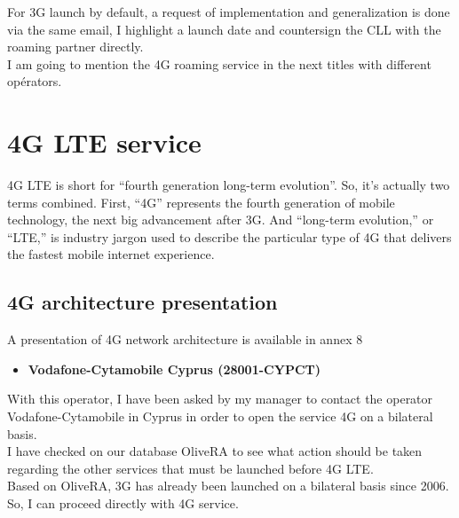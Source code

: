 For \acs{3G} launch by default, a request of implementation and generalization is done via the same email, I highlight a launch date and countersign the \acs{CLL} with the roaming partner directly.\\

I am going to mention the \acs{4G} roaming service in the next titles with different opérators.\\

\section{\acs{4G} \acs{LTE} service}
\-\hspace{0.5cm} \acs{4G} \acs{LTE} is short for “fourth generation long-term evolution”. So, it’s actually two terms combined. First, “\acs{4G}” represents the fourth generation of mobile technology, the next big advancement after \acs{3G}. And “long-term evolution,” or “LTE,” is industry jargon used to describe the particular type of \acs{4G} that delivers the fastest mobile internet experience. \cite{4glte}\\

\subsection{\acs{4G} architecture presentation}
\-\hspace{0.5cm} A presentation of \acs{4G} network architecture is available in annex 8 \cite{annexes}\\

\begin{itemize}
    \item {\large \textbf{Vodafone-Cytamobile Cyprus (28001-CYPCT)}}\\
\end{itemize}

With this operator, I have been asked by my manager to contact the operator Vodafone-Cytamobile in Cyprus in order to open the service \acs{4G} on a bilateral basis.\\

I have checked on our database \acs{OliveRA} to see what action should be taken regarding the other services that must be launched before \acs{4G} LTE.  \\

Based on \acs{OliveRA}, \acs{3G} has already been launched on a bilateral basis since 2006. So, I can proceed directly with \acs{4G} service.\\

